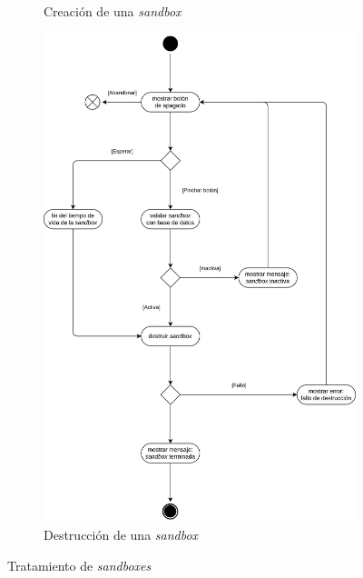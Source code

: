 \begin{figure}[h]
\begin{subfigure}{0.45\textwidth}
                    \caption{Creación de una \textit{sandbox}}
                    \label{fig:creacion-sandbox}
                \end{subfigure}

                \hfill
                
                \begin{subfigure}{0.45\textwidth}
                    \centering
                    
                    \includegraphics[scale=0.10]{images/Diagramas/Actividades y transiciones 5.png}
                    
                    \caption{Destrucción de una \textit{sandbox}}
                    \label{fig:destruccion-sandbox}
                \end{subfigure}
                
                \caption{Tratamiento de \textit{sandboxes}}
                \label{fig:tratamiento-sandboxes}
            \end{figure}
            
